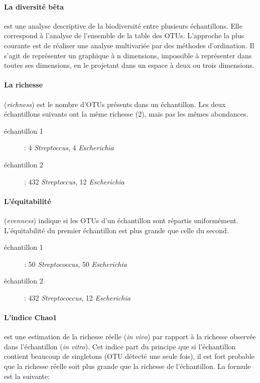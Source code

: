 \documentclass[12pt,a4paper]{article}
\begin{document}
\paragraph{La diversité bêta} est une analyse descriptive de la biodiversité entre plusieurs échantillons. Elle correspond à l'analyse de l’ensemble de la table des OTUs. L’approche la plus courante est de réaliser une analyse multivariée par des méthodes d’ordination. Il s’agit de représenter un graphique à n dimensions, impossible à représenter dans toutes ses dimensions, en le projetant dans un espace à deux ou trois dimensions.

\paragraph{La richesse}(\textit{richness}) est le nombre d'OTUs présents dans un échantillon. Les deux échantillons suivants ont la même richesse (2), mais pas les mêmes abondances.

\begin{description}
\item[échantillon 1] : 4 \textit{Streptoccus}, 4 \textit{Escherichia}
\item[échantillon 2] : 432 \textit{Streptoccus}, 12 \textit{Escherichia}
\end{description}

\paragraph{L'équitabilité}(\textit{evenness}) indique si les OTUs d’un échantillon sont répartis uniformément.
L'équitabilité du premier échantillon est plus grande que celle du second.

\begin{description}
\item[échantillon 1] : 50 \textit{Streptococcus}, 50 \textit{Escherichia}
\item[échantillon 2] : 432 \textit{Streptococcus}, 12 \textit{Escherichia}
\end{description}


\paragraph{L'indice Chao1}est une estimation de la richesse réelle (\textit{in vivo}) par rapport à la richesse observée dans l'échantillon (\textit{in vitro}). Cet indice part du principe que si l’échantillon contient beaucoup de singletons (OTU détecté une seule fois), il est fort probable que la richesse réelle soit plus grande que la richesse de l’échantillon. La formule est la suivante:
\end{document}
